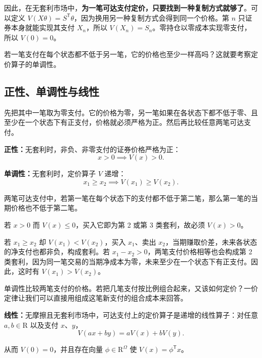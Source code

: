 因此，在无套利市场中，\textbf{为一笔可达支付定价，只要找到一种复制方式就够了}。可以定义 $V(X\theta)=S^{\mathsf T}\theta$，因为换用另一种复制方式会得到同一个价格。第 $n$ 只证券本身就能实现其支付 $X_n$，所以 $V(X_n)=S_n$。零持仓以零成本实现零支付，所以 $V(0)=0$。

若一笔支付在每个状态都不低于另一笔，它的价格也至少一样高吗？这就要考察定价算子的单调性。

\subsection{正性、单调性与线性}
先把其中一笔取为零支付。它的价格为零，另一笔如果在各状态下都不低于零、且至少在一个状态下有正支付，价格就必须严格为正。然后再比较任意两笔可达支付。

\begin{tcolorbox}[knowledge]
\textbf{正性：}无套利时，非负、非零支付的证券价格严格为正：
\begin{equation}
    x>0\implies V(x)>0.
 \label{eq:wj-four-3}
\end{equation}
\end{tcolorbox}

\begin{tcolorbox}[knowledge]
\textbf{单调性：}无套利时，定价算子 $V$ 递增：
\begin{equation}
    x_1\ge x_2\implies V(x_1)\ge V(x_2).
 \label{eq:wj-four-4}
\end{equation}

两笔可达支付中，若第一笔在每个状态下的支付都不低于第二笔，那么第一笔的当期价格也不低于第二笔。
\end{tcolorbox}

\begin{solution}[label-content={证明},blank-type=none]
若 $x>0$ 而 $V(x)\le0$，买入它即为第 2 或第 3 类套利，故必须 $V(x)>0$。

若 $x_1\ge x_2$ 却 $V(x_1)<V(x_2)$，买入 $x_1$、卖出 $x_2$，当期赚取价差，未来各状态的净支付也都非负，构成套利。若 $x_1-x_2>0$，两笔支付价格相等也会构成第 2 类套利，因为同一笔交易的当期净成本为零，未来至少在一个状态下有正支付。因此，这时有 $V(x_1)>V(x_2)$。
\end{solution}

单调性比较两笔支付的价格。若把几笔支付按比例组合起来，又该如何定价？一价定律让我们可以直接用组成这笔新支付的组合成本来回答。

\begin{tcolorbox}[knowledge]
\textbf{线性：}无摩擦且无套利市场中，可达支付上的定价算子是递增的线性算子：对任意 $a,b\in\mathrm{R}$ 以及支付 $x$、$y$，
\begin{equation}
    V(ax+by)=aV(x)+bV(y).
 \label{eq:wj-four-5}
\end{equation}

从而 $V(0)=0$，并且存在向量 $\phi\in\mathrm{R}^{\Omega}$ 使 $V(x)=\phi^{\mathsf T}x$。
\end{tcolorbox}

